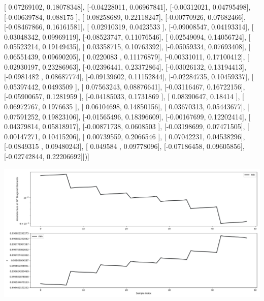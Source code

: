 \documentclass{article}
\begin{document}
       [ 0.07269102,  0.18078348],
       [-0.04228011,  0.06967841],
       [-0.00312021,  0.04795498],
       [-0.00639784,  0.088175  ],
       [ 0.08258689,  0.22118247],
       [-0.00770926,  0.07682466],
       [-0.08467866,  0.16161581],
       [ 0.02910319,  0.0423533 ],
       [-0.09008547,  0.04193314],
       [ 0.03048342,  0.09969119],
       [-0.08523747,  0.11076546],
       [ 0.02549094,  0.14056724],
       [ 0.05523214,  0.19149435],
       [ 0.03358715,  0.10763392],
       [-0.05059334,  0.07693408],
       [ 0.06551439,  0.09690205],
       [ 0.0220083 ,  0.11176879],
       [-0.00331011,  0.17100412],
       [ 0.02930197,  0.23286963],
       [-0.02396441,  0.23372864],
       [-0.03026132,  0.13194413],
       [-0.0981482 ,  0.08687774],
       [-0.09139602,  0.11152844],
       [-0.02284735,  0.10459337],
       [ 0.05397442,  0.0493509 ],
       [ 0.07563243,  0.08876641],
       [-0.03116467,  0.16722156],
       [-0.05900657,  0.1281959 ],
       [-0.04185033,  0.1731869 ],
       [ 0.08390647,  0.18414   ],
       [ 0.06972767,  0.1976635 ],
       [ 0.06104698,  0.14850156],
       [ 0.03670313,  0.05443677],
       [ 0.07591252,  0.19823106],
       [-0.01565496,  0.18396609],
       [-0.00167699,  0.12202414],
       [ 0.04379814,  0.05818917],
       [-0.00871738,  0.0608503 ],
       [-0.03198699,  0.07471505],
       [ 0.00147271,  0.10415206],
       [ 0.00739559,  0.2066546 ],
       [ 0.07042231,  0.04538296],
       [-0.0849315 ,  0.09480243],
       [ 0.049584  ,  0.09778096],
       [-0.07186458,  0.09605856],
       [-0.02742844,  0.22206692]])]
\begin{center}
\includegraphics[scale=.9]{report_pickled_controls159/control_dpn_all.png}

\end{center}
\end{document}
